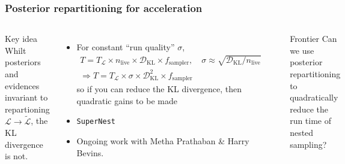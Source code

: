 \documentclass[aspectratio=169]{beamer}
\begin{document}
\begin{frame}
    \frametitle{Posterior repartitioning for acceleration}
    \begin{columns}
        \begin{exampleblock}{Key idea}
            Whilt posteriors and evidences invariant to repartioning $\mathcal{L}\to\tilde{\mathcal{L}}$, the KL divergence is not.
        \end{exampleblock}
    \begin{itemize}
            \item For constant ``run quality'' $\sigma$, 
            \begin{gather*} 
                {\scriptstyle
         T = T_\mathcal{L} \times n_\text{live} \times \mathcal{D}_\text{KL} \times f_\text{sampler}, \quad
\sigma \approx \sqrt{\mathcal{D}_\text{KL}/n_\text{live}} }
    \\
    \Rightarrow\boxed{T = T_\mathcal{L} \times \sigma \times \mathcal{D}_\text{KL}^2 \times f_\text{sampler}} 
        \end{gather*}
            so if you can reduce the KL divergence, then quadratic gains to be made
        \item \texttt{SuperNest}~
        \item Ongoing work with Metha Prathaban \& Harry Bevins.
    \end{itemize}
        \vspace{8pt}
        \includegraphics[width=\textwidth]{figures/supernest.pdf}
    \begin{alertblock}{Frontier}
        Can we use posterior repartitioning to quadratically reduce the run time of nested sampling?
    \end{alertblock}
    \end{columns}
\end{frame}
\end{document}
